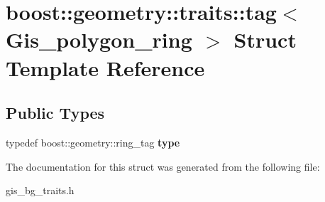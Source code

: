 \hypertarget{structboost_1_1geometry_1_1traits_1_1tag_3_01Gis__polygon__ring_01_4}{}\section{boost\+:\+:geometry\+:\+:traits\+:\+:tag$<$ Gis\+\_\+polygon\+\_\+ring $>$ Struct Template Reference}
\label{structboost_1_1geometry_1_1traits_1_1tag_3_01Gis__polygon__ring_01_4}
\subsection*{Public Types}
\begin{DoxyCompactItemize}
\item 
\mbox{\label{structboost_1_1geometry_1_1traits_1_1tag_3_01Gis__polygon__ring_01_4_ad84647901ae3e69b09fb4dbf2bf1ac5a}} 
typedef boost\+::geometry\+::ring\+\_\+tag {\bfseries type}
\end{DoxyCompactItemize}


The documentation for this struct was generated from the following file\+:\begin{DoxyCompactItemize}
\item 
gis\+\_\+bg\+\_\+traits.\+h\end{DoxyCompactItemize}
